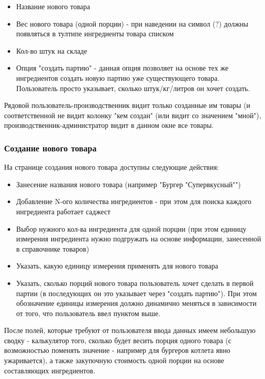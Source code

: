 \documentclass[DIV=calc, paper=a4, fontsize=11pt]{scrartcl} %
\begin{document}
\begin{itemize}
	\item Название нового товара
	\item Вес нового товара (одной порции) - при наведении на символ (?) должны появляться в тултипе ингредиенты товара списком
	\item Кол-во штук на складе 
	\item Опция "создать партию" - данная опция позволяет на основе тех же ингредиентов создать новую партию уже существующего товара. Пользователь просто указывает, сколько штук/кг/литров он хочет создать.
\end{itemize}

Рядовой пользователь-производственник видит только созданные им товары (и соответственной не видит колонку "кем создан" (или видит со значением "мной"), производственник-администратор видит в данном окне все товары.

\subsubsection{Создание нового товара}

На странице создания нового товара доступны следующие действия:

\begin{itemize}
	\item Занесение названия нового товара (например "Бургер "Супервкусный"")
	\item Добавление N-ого количества ингредиентов - при этом для поиска каждого ингредиента работает саджест
	\item Выбор нужного кол-ва ингредиента для одной порции (при этом единицу измерения ингредиента нужно подгружать на основе информации, занесенной в справочнике товаров)
	\item Указать, какую единицу измерения применять для нового товара
	\item Указать, сколько порций нового товара пользователь хочет сделать в первой партии (в последующих он это указывает через "создать партию"). При этом обозначение единицы измерения должно динамично меняться в зависимости от того, что пользователь ввел пунктом выше.
\end{itemize}

После полей, которые требуют от пользователя ввода данных имеем небольшую сводку - калькулятор того, сколько будет весить порция одного товара (с возможностью поменять значение - например для бургеров котлета явно ужаривается), а также закупочную стоимость одной порции на основе составляющих ингредиентов.
\end{document}
